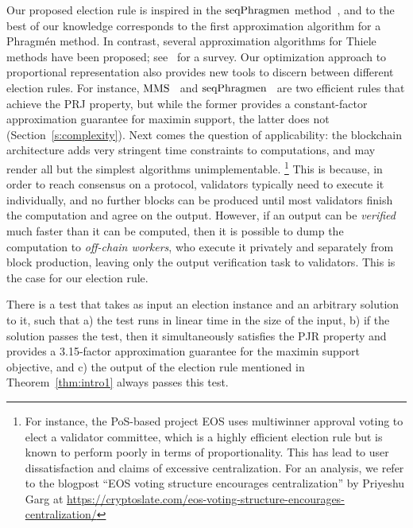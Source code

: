 Our proposed election rule is inspired in the $\operatorname{seqPhragmen}$ method~\cite{brill2017phragmen}, and to the best of our knowledge corresponds to the first approximation algorithm for a Phragm\'{e}n method. 
In contrast, several approximation algorithms for Thiele methods have been proposed; see~\cite{lackner2020approval} for a survey. 
%
Our optimization approach to proportional representation also provides new tools to discern between different election rules. For instance, $\operatorname{MMS}$~\cite{sanchez2016maximin} and $\operatorname{seqPhragmen}$~\cite{brill2017phragmen} are two efficient rules that achieve the PRJ property, but while the former provides a constant-factor approximation guarantee for maximin support, the latter does not (Section~\ref{s:complexity}). 
%
Next comes the question of applicability: the blockchain architecture adds very stringent time constraints to computations, and may render all but the simplest algorithms unimplementable.%
%
\footnote{For instance, the PoS-based project EOS uses multiwinner approval voting to elect a validator committee, which is a highly efficient election rule but is known to perform poorly in terms of proportionality. This has lead to user dissatisfaction and claims of excessive centralization. 
For an analysis, we refer to the blogpost ``EOS voting structure encourages centralization'' by Priyeshu Garg at \url{https://cryptoslate.com/eos-voting-structure-encourages-centralization/}} %
% 
This is because, in order to reach consensus on a protocol, validators typically need to execute it individually, and no further blocks can be produced until most validators finish the computation and agree on the output. 
However, if an output can be \emph{verified} much faster than it can be computed, then it is possible to dump the computation to \emph{off-chain workers}, who execute it privately and separately from block production, leaving only the output verification task to validators. This is the case for our election rule.

\begin{theorem}\label{thm:intro2}
There is a test that takes as input an election instance and an arbitrary solution to it, such that a) the test runs in linear time in the size of the input, b) if the solution passes the test, then it simultaneously satisfies the PJR property and provides a 3.15-factor approximation guarantee for the maximin support objective, and c) the output of the election rule mentioned in Theorem~\ref{thm:intro1} always passes this test.
\end{theorem}

